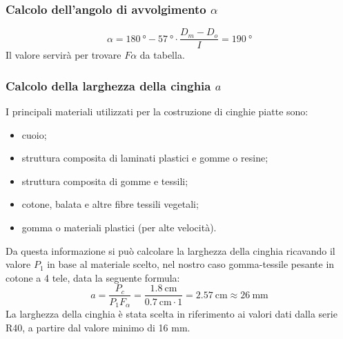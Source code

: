 \documentclass{report}
\begin{document}
\subsubsection{Calcolo dell’angolo di avvolgimento $\alpha$}
\begin{equation}
  \alpha = \SI{180}{\degree}-\SI{57}{\degree}\cdot\frac{D_m-D_o}{I}=\SI{190}{\degree}
\end{equation}
Il valore servirà per trovare $F\alpha$ da tabella.
\subsubsection{Calcolo della larghezza della cinghia $a$}
I principali materiali utilizzati per la costruzione di cinghie piatte sono:
\begin{itemize}
\item cuoio;
\item struttura composita di laminati plastici e gomme o resine;
\item struttura composita di gomme e tessili;
\item cotone, balata e altre fibre tessili vegetali;
\item gomma o materiali plastici (per alte velocità).
\end{itemize}
Da questa informazione si può calcolare la larghezza della cinghia ricavando il valore $P_1$ in base al materiale scelto, nel nostro caso gomma-tessile pesante in cotone a 4 tele, data la seguente formula:
\begin{equation}
  a = \frac{P_c}{P_1F_\alpha}=\frac{\SI{1,8}{\cm}}{\SI{0,7}{\cm}\cdot 1} = \SI{2,57}{\cm}\approx\SI{26}{\mm}
\end{equation}
La larghezza della cinghia è stata scelta in riferimento ai valori dati dalla serie R40, a partire dal valore minimo di 16 mm.
\end{document}
